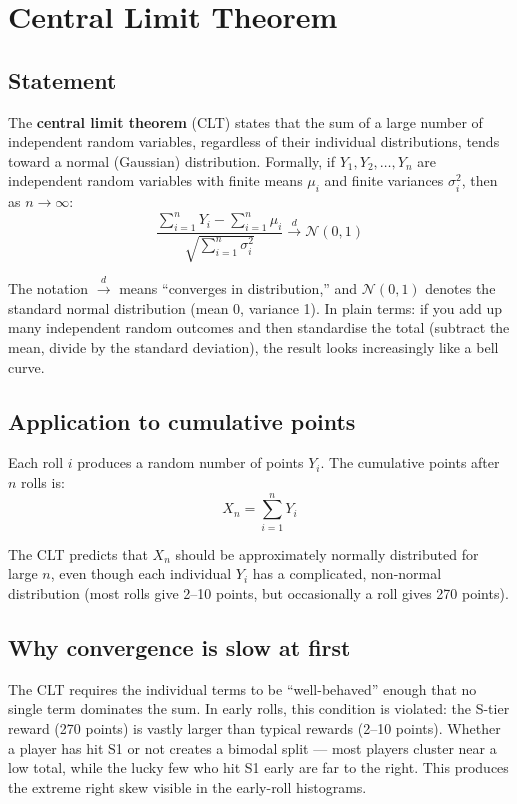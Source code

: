 \documentclass[11pt,a4paper]{article}
\theoremstyle{remark}
\begin{document}
\section{Central Limit Theorem}

\subsection{Statement}

The \textbf{central limit theorem} (CLT) states that the sum of a large number of independent random variables, regardless of their individual distributions, tends toward a normal (Gaussian) distribution. Formally, if $Y_1, Y_2, \ldots, Y_n$ are independent random variables with finite means $\mu_i$ and finite variances $\sigma_i^2$, then as $n \to \infty$:
\[
\frac{\sum_{i=1}^{n} Y_i - \sum_{i=1}^{n} \mu_i}{\sqrt{\sum_{i=1}^{n} \sigma_i^2}} \xrightarrow{d} \mathcal{N}(0, 1)
\]

The notation $\xrightarrow{d}$ means ``converges in distribution,'' and $\mathcal{N}(0,1)$ denotes the standard normal distribution (mean 0, variance 1). In plain terms: if you add up many independent random outcomes and then standardise the total (subtract the mean, divide by the standard deviation), the result looks increasingly like a bell curve.

\subsection{Application to cumulative points}

Each roll $i$ produces a random number of points $Y_i$. The cumulative points after $n$ rolls is:
\[
X_n = \sum_{i=1}^{n} Y_i
\]

The CLT predicts that $X_n$ should be approximately normally distributed for large $n$, even though each individual $Y_i$ has a complicated, non-normal distribution (most rolls give 2--10 points, but occasionally a roll gives 270 points).

\subsection{Why convergence is slow at first}

The CLT requires the individual terms to be ``well-behaved'' enough that no single term dominates the sum. In early rolls, this condition is violated: the S-tier reward (270 points) is vastly larger than typical rewards (2--10 points). Whether a player has hit S1 or not creates a bimodal split --- most players cluster near a low total, while the lucky few who hit S1 early are far to the right. This produces the extreme right skew visible in the early-roll histograms.
\end{document}
